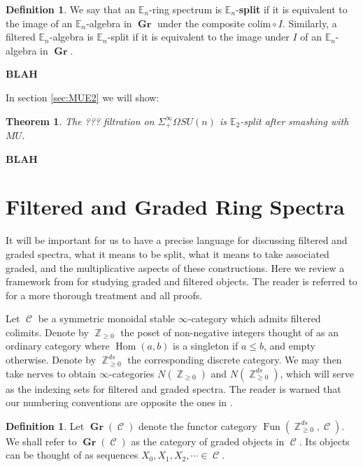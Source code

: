 \documentclass[reqno, oneside]{amsart}
\theoremstyle{definition}
\newtheorem{dfn}[nul]{Definition}
\theoremstyle{plain}
\newtheorem{thm}[nul]{Theorem}
\DeclareMathOperator{\Hom}{\text{Hom}}
\DeclareMathOperator{\C}{\mathcal{C}}
\DeclareMathOperator{\Z}{\mathbb{Z}}
\DeclareMathOperator{\Gr}{\textbf{Gr}}
\DeclareMathOperator{\Fun}{\text{Fun}}
\begin{document}
\begin{dfn}
We say that an $\mathbb{E}_n$-ring spectrum is $\mathbb{E}_n$-\textbf{split} if it is equivalent to the image of an $\mathbb{E}_n$-algebra in $\Gr$ under the composite $\text{colim} \circ I.$  Similarly, a filtered $\mathbb{E}_n$-algebra is $\mathbb{E}_n$-split if it is equivalent to the image under $I$ of an $\mathbb{E}_n$-algebra in $\Gr$.
\end{dfn}

\textbf{BLAH}

In section \ref{sec:MUE2} we will show:
\begin{thm}
The ??? filtration on $\Sigma^{\infty}_+ \Omega SU(n)$ is $\mathbb{E}_2$-split after smashing with $MU$.
\end{thm}

\textbf{BLAH}



\section{Filtered and Graded Ring Spectra} \label{sec:FilGra}

It will be important for us to have a precise language for discussing filtered and graded spectra, what it means to be split, what it means to take associated graded, and the multiplicative aspects of these constructions. Here we review a framework from \cite{LurieRot} for studying graded and filtered objects.  The reader is referred to \cite{LurieRot} for a more thorough treatment and all proofs.  

Let $\C$ be a symmetric monoidal stable $\infty$-category which admits filtered colimits.  Denote by $\Z_{\geq 0}$ the poset of non-negative integers thought of as an ordinary category where $\Hom(a,b)$ is a singleton if $a\leq b$, and empty otherwise.  Denote by $\Z_{\geq 0}^{ds}$ the corresponding discrete category.  We may then take nerves to obtain $\infty$-categories $N(\Z_{\geq 0})$ and $N(\Z_{\geq 0}^{ds})$, which will serve as the indexing sets for filtered and graded spectra.  The reader is warned that our numbering conventions are opposite the ones in \cite{LurieRot}.

\begin{dfn} 
Let $\Gr(\C)$ denote the functor category $\Fun(\Z_{\geq 0}^{ds}, \C).$  We shall refer to $\Gr(\C)$ as the category of graded objects in $\C$.  Its objects can be thought of as sequences $X_0, X_1,X_2,\cdots \in \C$.
\end{dfn}
\end{document}

